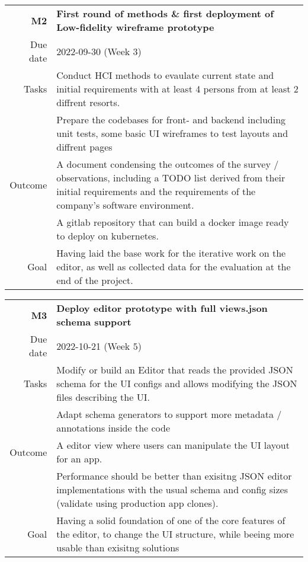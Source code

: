 \small
\colorbox{usethiscolorhere}{
    \centering
    \begin{tabularx}{\textwidth}{@{} r Y @{}}
        \textbf{M2}
        & \textbf{First round of methods \& first deployment of Low-fidelity wireframe prototype}\vspace{2mm}\\
        Due date & 2022-09-30 (Week $3$)\vspace{2mm}\\
        Tasks & Conduct HCI methods to evaulate current state and initial requirements with at least 4 persons from at least 2 diffrent resorts.\\
        & Prepare the codebases for front- and backend including unit tests, some basic UI wireframes to test layouts and diffrent pages\vspace{2mm}\\
        Outcome & A document condensing the outcomes of the survey / observations, including a TODO list derived from their initial requirements and the requirements of the company's software environment.\\
        & A gitlab repository that can build a docker image ready to deploy on kubernetes.\vspace{2mm}\\
        Goal & Having laid the base work for the iterative work on the editor, as well as collected data for the evaluation at the end of the project.\vspace{2mm}
        
    \end{tabularx}
}

\small
\colorbox{usethiscolorhere}{
    \centering
    \begin{tabularx}{\textwidth}{@{} r Y @{}}
        \textbf{M3}
        & \textbf{Deploy editor prototype with full views.json schema support}\vspace{2mm}\\
        Due date & 2022-10-21 (Week $5$)\vspace{2mm}\\
            Tasks & Modify or build an Editor that reads the provided JSON schema for the UI configs and allows modifying the JSON files describing the UI.\\
            & Adapt schema generators to support more metadata / annotations inside the code\vspace{2mm}\\
        Outcome & A editor view where users can manipulate the UI layout for an app.\\
        & Performance should be better than exisitng JSON editor implementations with the usual schema and config sizes (validate using production app clones).\vspace{2mm}\\
        Goal & Having a solid foundation of one of the core features of the editor, to change the UI structure, while beeing more usable than exisitng solutions\vspace{2mm}
    \end{tabularx}
}

